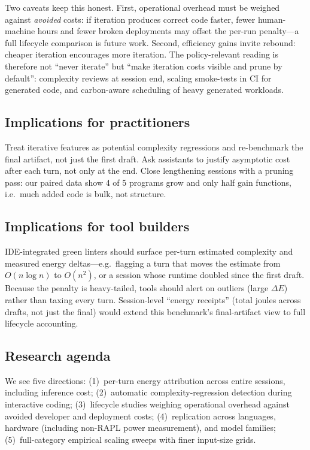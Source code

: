 \documentclass[journal]{IEEEtran}
\begin{document}
Two caveats keep this honest. First, operational overhead must be weighed
against \emph{avoided} costs: if iteration produces correct code faster,
fewer human-machine hours and fewer broken deployments may offset the
per-run penalty---a full lifecycle comparison is future work. Second,
efficiency gains invite rebound: cheaper iteration encourages more
iteration. The policy-relevant reading is therefore not ``never iterate''
but ``make iteration costs visible and prune by default'': complexity
reviews at session end, scaling smoke-tests in CI for generated code, and
carbon-aware scheduling of heavy generated workloads.

\subsection{Implications for practitioners}
Treat iterative features as potential complexity regressions and re-benchmark
the final artifact, not just the first draft. Ask assistants to justify
asymptotic cost after each turn, not only at the end. Close lengthening
sessions with a pruning pass: our paired data show 4 of 5 programs grow and
only half gain functions, i.e.\ much added code is bulk, not structure.

\subsection{Implications for tool builders}\label{sec:discuss-tools}
IDE-integrated green linters should surface per-turn estimated complexity
and measured energy deltas---e.g.\ flagging a turn that moves the estimate
from $O(n\log n)$ to $O(n^2)$, or a session whose runtime doubled since the
first draft. Because the penalty is heavy-tailed, tools should alert on
outliers (large $\Delta E$) rather than taxing every turn. Session-level
``energy receipts'' (total joules across drafts, not just the final) would
extend this benchmark's final-artifact view to full lifecycle accounting.

\subsection{Research agenda}
We see five directions: (1)~per-turn energy attribution across entire
sessions, including inference cost; (2)~automatic complexity-regression
detection during interactive coding; (3)~lifecycle studies weighing
operational overhead against avoided developer and deployment costs;
(4)~replication across languages, hardware (including non-RAPL power
measurement), and model families; (5)~full-category empirical scaling sweeps
with finer input-size grids.
\end{document}
